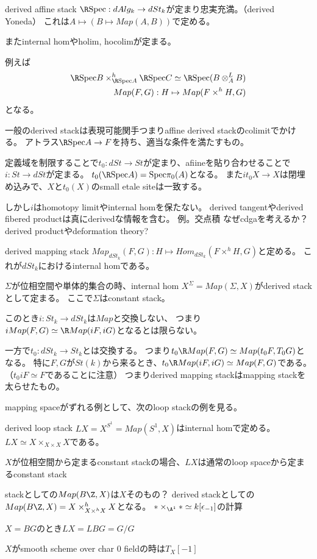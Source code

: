 \documentclass[dvipdfmx]{beamer}
\newcommand{\spec}{\mathrm{Spec}}
\begin{document}
\begin{frame}{derived affine stack}
$\R \spec:dAlg_k \to dSt_k$が定まり忠実充満。（derived Yoneda）
これは$A \mapsto (B \mapsto Map(A,B))$で定める。

またinternal homやholim, hocolimが定まる。

例えば
\begin{align*}
\R \spec B \times^h_{\R \spec A}\R \spec C \simeq \R \spec(B \otimes^L_AB)\\
Map(F,G):H\mapsto Map(F\times^hH,G)
\end{align*}
となる。

一般のderived stackは表現可能関手つまりaffine derived stackのcolimitでかける。
アトラス$\R \spec A \to F$を持ち、適当な条件を満たすもの。

定義域を制限することで$t_0:dSt \to St$が定まり、afiineを貼り合わせることで$i:St \to dSt$が定まる。
$t_0(\R \spec A)=\spec \pi_0(A)$となる。
また$it_0X \to X$は閉埋め込みで、$X$と$t_0(X)$のsmall etale siteは一致する。

しかし$i$はhomotopy limitやinternal homを保たない。
derived tangentやderived fibered productは真にderivedな情報を含む。
例。交点積
なぜcdgaを考えるか？
derived productやdeformation theory?

\end{frame}

\begin{frame}{derived mapping stack}
$Map_{dSt_k}(F,G):H \mapsto Hom_{dSt_k}(F\times^hH, G)$と定める。
これが$dSt_k$におけるinternal homである。

$\Sigma$が位相空間や単体的集合の時、internal hom $X^\Sigma=Map(\Sigma,X)$がderived stackとして定まる。
ここで$\Sigma$はconstant stack。

このとき$i:St_k \to dSt_k$は$Map$と交換しない、
つまり$iMap(F,G)\simeq \R Map(iF, iG)$となるとは限らない。

一方で$t_0:dSt_k \to St_k$とは交換する。
つまり$t_0\R Map(F,G) \simeq Map(t_0F, T_0G)$となる。
特に$F, G$が$St(k)$から来るとき、$t_0\R Map(iF, iG)\simeq Map(F,G)$である。（$t_0iF\simeq F$であることに注意）
つまりderived mapping stackはmapping stackを太らせたもの。

mapping spaceがずれる例として、次のloop stackの例を見る。
\end{frame}

\begin{frame}{derived loop stack}
$LX=X^{S^1}=Map(S^1,X)$はinternal homで定める。
$LX \simeq X\times_{X\times X}X$である。

$X$が位相空間から定まるconstant stackの場合、$LX$は通常のloop spaceから定まるconstant stack

stackとしての$Map(B\Z, X)$は$X$そのもの？
derived stackとしての$Map(B\Z, X)=X\times^h_{X\times^hX}X$となる。
$\ast \times_{\A^1}\ast\simeq k[\epsilon_{-1}]$の計算

$X=BG$のとき$LX=LBG=G/G$

$X$がsmooth scheme over char $0$ fieldの時は$T_X[-1]$
\end{frame}
\end{document}

